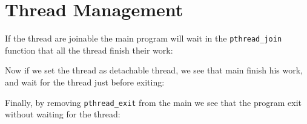 \chapter{Thread Management}

If the thread are joinable the main program will wait in the \verb+pthread_join+ function that all the thread finish their work:



Now if we set the thread as detachable thread, we see that main finish his work, and wait for the thread just before exiting:



Finally, by removing \verb+pthread_exit+ from the main we see that the program exit without waiting for the thread:


